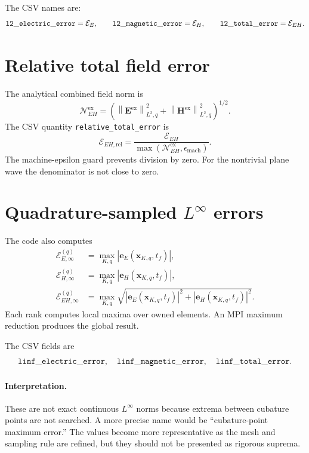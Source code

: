 \documentclass[11pt]{article}
\newcommand{\vect}[1]{\boldsymbol{#1}}
\newcommand{\norm}[1]{\left\lVert #1 \right\rVert}
\newcommand{\abs}[1]{\left| #1 \right|}
\newcommand{\code}[1]{\nolinkurl{#1}}
\newcommand{\mcode}[1]{\mathtt{\detokenize{#1}}}
\newcommand{\Eex}{\vect E^{\mathrm{ex}}}
\newcommand{\Hex}{\vect H^{\mathrm{ex}}}
\begin{document}
The CSV names are:
\[
  \mcode{l2_electric_error}=\mathcal{E}_E,\qquad
  \mcode{l2_magnetic_error}=\mathcal{E}_H,\qquad
  \mcode{l2_total_error}=\mathcal{E}_{EH}.
\]

\section{Relative total field error}

The analytical combined field norm is
\[
  \mathcal{N}_{EH}^{\mathrm{ex}}
  =
  \left(
    \norm{\Eex}_{L^2,q}^2+
    \norm{\Hex}_{L^2,q}^2
  \right)^{1/2}.
\]
The CSV quantity \code{relative_total_error} is
\[
  \mathcal{E}_{EH,\mathrm{rel}}
  =
  \frac{\mathcal{E}_{EH}}
       {\max(\mathcal{N}_{EH}^{\mathrm{ex}},
             \epsilon_{\mathrm{mach}})}.
\]
The machine-epsilon guard prevents division by zero. For the nontrivial plane
wave the denominator is not close to zero.

\section{\texorpdfstring{Quadrature-sampled \(L^\infty\) errors}
       {Quadrature-sampled Linfinity errors}}

The code also computes
\begin{align}
  \mathcal{E}_{E,\infty}^{(q)}
    &=
    \max_{K,q}
    \abs{\vect e_E(\vect x_{K,q},t_f)},\\
  \mathcal{E}_{H,\infty}^{(q)}
    &=
    \max_{K,q}
    \abs{\vect e_H(\vect x_{K,q},t_f)},\\
  \mathcal{E}_{EH,\infty}^{(q)}
    &=
    \max_{K,q}
    \sqrt{
      \abs{\vect e_E(\vect x_{K,q},t_f)}^2+
      \abs{\vect e_H(\vect x_{K,q},t_f)}^2
    }.
\end{align}
Each rank computes local maxima over owned elements. An MPI maximum reduction
produces the global result.

The CSV fields are
\[
  \mcode{linf_electric_error},\quad
  \mcode{linf_magnetic_error},\quad
  \mcode{linf_total_error}.
\]

\paragraph{Interpretation.}
These are not exact continuous \(L^\infty\) norms because extrema between
cubature points are not searched. A more precise name would be
``cubature-point maximum error.'' The values become more representative as
the mesh and sampling rule are refined, but they should not be presented as
rigorous suprema.
\end{document}
